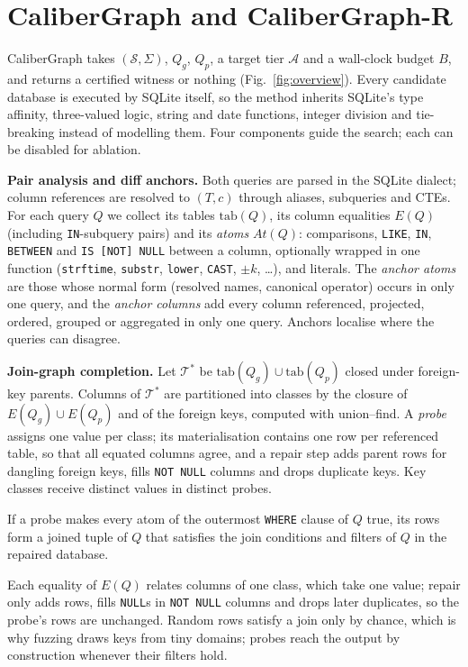 \section{CaliberGraph and CaliberGraph-R}\label{sec:method}

CaliberGraph takes $(\mathcal S,\Sigma)$, $Q_g$, $Q_p$, a target tier $\mathcal A$ and a wall-clock budget $B$, and returns a certified witness or nothing (Fig.~\ref{fig:overview}). Every candidate database is executed by SQLite itself, so the method inherits SQLite's type affinity, three-valued logic, string and date functions, integer division and tie-breaking instead of modelling them. Four components guide the search; each can be disabled for ablation.



\textbf{Pair analysis and diff anchors.} Both queries are parsed in the SQLite dialect; column references are resolved to $(T,c)$ through aliases, subqueries and CTEs. For each query $Q$ we collect its tables $\mathrm{tab}(Q)$, its column equalities $E(Q)$ (including \texttt{IN}-subquery pairs) and its \emph{atoms} $\mathit{At}(Q)$: comparisons, \texttt{LIKE}, \texttt{IN}, \texttt{BETWEEN} and \texttt{IS [NOT] NULL} between a column, optionally wrapped in one function (\texttt{strftime}, \texttt{substr}, \texttt{lower}, \texttt{CAST}, $\pm k$, \dots), and literals. The \emph{anchor atoms} are those whose normal form (resolved names, canonical operator) occurs in only one query, and the \emph{anchor columns} add every column referenced, projected, ordered, grouped or aggregated in only one query. Anchors localise where the queries can disagree.

\textbf{Join-graph completion.} Let $\mathcal T^{*}$ be $\mathrm{tab}(Q_g)\cup\mathrm{tab}(Q_p)$ closed under foreign-key parents. Columns of $\mathcal T^{*}$ are partitioned into classes by the closure of $E(Q_g)\cup E(Q_p)$ and of the foreign keys, computed with union--find. A \emph{probe} assigns one value per class; its materialisation contains one row per referenced table, so that all equated columns agree, and a repair step adds parent rows for dangling foreign keys, fills \texttt{NOT NULL} columns and drops duplicate keys. Key classes receive distinct values in distinct probes.

\begin{proposition}[Reachability]
If a probe makes every atom of the outermost \texttt{WHERE} clause of $Q$ true, its rows form a joined tuple of $Q$ that satisfies the join conditions and filters of $Q$ in the repaired database.
\end{proposition}
\noindent Each equality of $E(Q)$ relates columns of one class, which take one value; repair only adds rows, fills \texttt{NULL}s in \texttt{NOT NULL} columns and drops later duplicates, so the probe's rows are unchanged. Random rows satisfy a join only by chance, which is why fuzzing draws keys from tiny domains; probes reach the output by construction whenever their filters hold.

